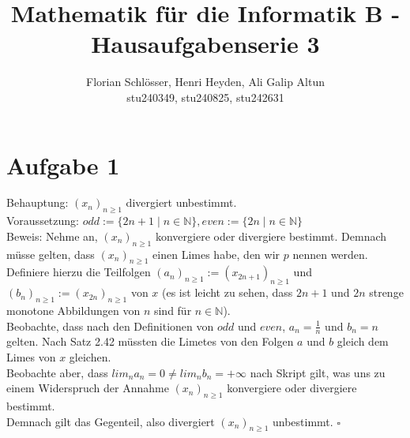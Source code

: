 \documentclass[12pt, a4paper]{article}
\title{Mathematik für die Informatik B - Hausaufgabenserie 3}
\author{Florian Schlösser, Henri Heyden, Ali Galip Altun \\ \small stu240349, stu240825, stu242631}
\date{}
\newcommand*{\qed}{\null\nobreak\hfill\ensuremath{\square}}
\begin{document}
\maketitle


\doublespacing
\section*{Aufgabe 1}
Behauptung: \((x_n)_{n\ge 1}\) divergiert unbestimmt. \\
Voraussetzung: \(odd := \{2n+1 \mid n \in \mathbb N\}, even := \{2n \mid n \in \mathbb N\}\) \\
Beweis: Nehme an, \((x_n)_{n\ge 1}\) konvergiere oder divergiere bestimmt. Demnach müsse gelten, dass \((x_n)_{n\ge 1}\) einen Limes habe, den wir \(p\) nennen werden. \\
Definiere hierzu die Teilfolgen \((a_n)_{n \ge 1} := (x_{2n+1})_{n \ge 1}\) und \((b_n)_{n \ge 1} := (x_{2n})_{n \ge 1}\) von \(x\) (es ist leicht zu sehen, dass \(2n + 1\) und \(2n\) strenge monotone Abbildungen von \(n\) sind für \(n \in \mathbb N\)).\\
Beobachte, dass nach den Definitionen von \(odd\) und \(even\), \(a_n = \frac{1}{n}\) und \(b_n = n\) gelten.
Nach Satz 2.42 müssten die Limetes von den Folgen \(a\) und \(b\) gleich dem Limes von \(x\) gleichen. \\
Beobachte aber, dass \(lim_n a_n = 0 \ne lim_n b_n = +\infty\) nach Skript gilt, was uns zu einem Widerspruch der Annahme \((x_n)_{n\ge 1}\) konvergiere oder divergiere bestimmt. \\
Demnach gilt das Gegenteil, also divergiert \((x_n)_{n\ge 1}\) unbestimmt. \qed
\end{document}
